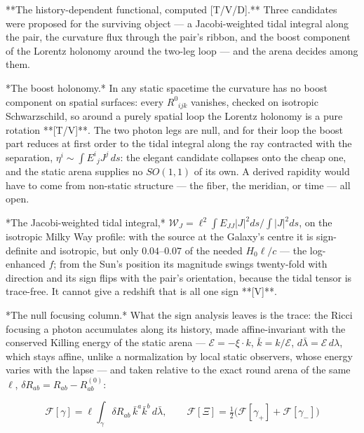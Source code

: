 **The history-dependent functional, computed [T/V/D].** Three candidates were proposed for the surviving object — a Jacobi-weighted tidal integral along the pair, the curvature flux through the pair's ribbon, and the boost component of the Lorentz holonomy around the two-leg loop — and the arena decides among them.

*The boost holonomy.* In any static spacetime the curvature has no boost component on spatial surfaces: every $R^0{}_{ijk}$ vanishes, checked on isotropic Schwarzschild, so around a purely spatial loop the Lorentz holonomy is a pure rotation **[T/V]**. The two photon legs are null, and for their loop the boost part reduces at first order to the tidal integral along the ray contracted with the separation, $\eta^i\sim\int E^i{}_jJ^j\,ds$: the elegant candidate collapses onto the cheap one, and the static arena supplies no $SO(1,1)$ of its own. A derived rapidity would have to come from non-static structure — the fiber, the meridian, or time — all open.

*The Jacobi-weighted tidal integral,* $\mathcal W_J = \ell^2\int E_{JJ}|J|^2ds\big/\!\int|J|^2ds$, on the isotropic Milky Way profile: with the source at the Galaxy's centre it is sign-definite and isotropic, but only $0.04$–$0.07$ of the needed $H_0\ell/c$ — the log-enhanced $f$; from the Sun's position its magnitude swings twenty-fold with direction and its sign flips with the pair's orientation, because the tidal tensor is trace-free. It cannot give a redshift that is all one sign **[V]**.

*The null focusing column.* What the sign analysis leaves is the trace: the Ricci focusing a photon accumulates along its history, made affine-invariant with the conserved Killing energy of the static arena — $\mathcal E = -\xi\cdot k$, $\bar k = k/\mathcal E$, $d\bar\lambda = \mathcal E\,d\lambda$, which stays affine, unlike a normalization by local static observers, whose energy varies with the lapse — and taken relative to the exact round arena of the same $\ell$, $\delta R_{ab} = R_{ab}-R^{(0)}_{ab}$:

$$\mathcal F[\gamma] = \ell\int_\gamma\delta R_{ab}\,\bar k^a\bar k^b\,d\bar\lambda,\qquad \mathcal F[\Xi] = \tfrac12\big(\mathcal F[\gamma_+]+\mathcal F[\gamma_-]\big)$$

